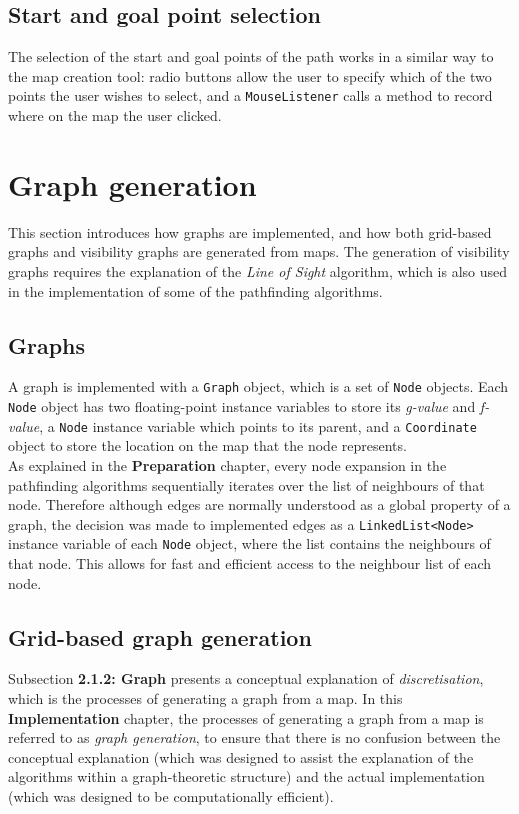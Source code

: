 \documentclass[12pt,notitlepage]{report}
\begin{document}
\subsection{Start and goal point selection}
The selection of the start and goal points of the path works in a similar way to the map creation tool: radio buttons allow the user to specify which of the two points the user wishes to select, and a {\tt MouseListener} calls a method to record where on the map the user clicked.

\section{Graph generation}

This section introduces how graphs are implemented, and how both grid-based graphs and visibility graphs are generated from maps. The generation of visibility graphs requires the explanation of the {\em Line of Sight} algorithm, which is also used in the implementation of some of the pathfinding algorithms.\\

\subsection{Graphs}
A graph is implemented with a {\tt Graph} object, which is a set of {\tt Node} objects. Each {\tt Node} object has two floating-point instance variables to store its {\em g-value} and {\em f-value}, a {\tt Node} instance variable which points to its parent, and a {\tt Coordinate} object to store the location on the map that the node represents.\\

\noindent
As explained in the {\bfseries Preparation} chapter, every node expansion in the pathfinding algorithms sequentially iterates over the list of neighbours of that node. Therefore although edges are normally understood as a global property of a graph, the decision was made to implemented edges as a {\tt LinkedList<Node>} instance variable of each {\tt Node} object, where the list contains the neighbours of that node. This allows for fast and efficient access to the neighbour list of each node.\\

\subsection{Grid-based graph generation}
Subsection {\bfseries 2.1.2: Graph} presents a conceptual explanation of {\em discretisation}, which is the processes of generating a graph from a map. In this {\bfseries Implementation} chapter, the processes of generating a graph from a map is referred to as {\em graph generation}, to ensure that there is no confusion between the conceptual explanation (which was designed to assist the explanation of the algorithms within a graph-theoretic structure) and the actual implementation (which was designed to be computationally efficient). \\
\end{document}
